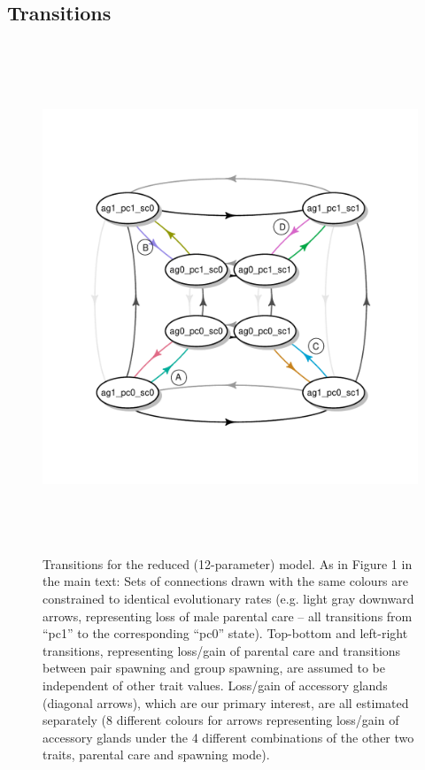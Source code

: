 \documentclass[
]{article}
\begin{document}
\hypertarget{transitions}{%
\subsection{Transitions}\label{transitions}}

\begin{figure}
\includegraphics[width=6in,height=6in]{pix/flowfig2} \caption{Transitions for the reduced (12-parameter) model. As in Figure 1 in the main text: Sets of connections drawn with the same colours are constrained to identical evolutionary rates (e.g. light gray downward arrows, representing loss of male parental care – all transitions from “pc1” to the corresponding “pc0” state). Top-bottom and left-right transitions, representing loss/gain of parental care and transitions between pair spawning and group spawning, are assumed to be independent of other trait values. Loss/gain of accessory glands (diagonal arrows), which are our primary interest, are all estimated separately (8 different colours for arrows representing loss/gain of accessory glands under the 4 different combinations of the other two traits, parental  care and spawning mode).}\label{fig:contrast-diag}
\end{figure}
\end{document}
